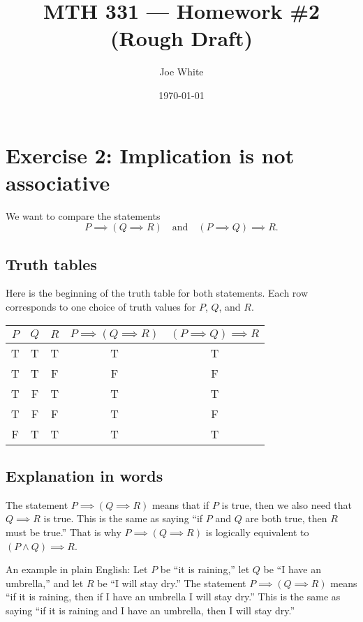 \documentclass[11pt]{article}
\title{MTH 331 — Homework \#2 (Rough Draft)}
\author{Joe White}
\date{\today}
\begin{document}
\maketitle

\section*{Exercise 2: Implication is not associative}

We want to compare the statements
\[
P \implies (Q \implies R) \quad \text{and} \quad (P \implies Q) \implies R.
\]

\subsection*{Truth tables}
Here is the beginning of the truth table for both statements. Each row corresponds to one choice of truth values for $P$, $Q$, and $R$.

\begin{center}
\begin{tabular}{|c|c|c||c|c|}
\hline
$P$ & $Q$ & $R$ & $P \implies (Q \implies R)$ & $(P \implies Q) \implies R$ \\
\hline
T & T & T & T & T \\
T & T & F & F & F \\
T & F & T & T & T \\
T & F & F & T & F \\
F & T & T & T & T \\
\hline
\end{tabular}
\end{center}

\subsection*{Explanation in words}
The statement $P \implies (Q \implies R)$ means that if $P$ is true, then we also need that $Q \implies R$ is true. This is the same as saying “if $P$ and $Q$ are both true, then $R$ must be true.” That is why $P \implies (Q \implies R)$ is logically equivalent to $(P \land Q) \implies R$.

An example in plain English: Let $P$ be “it is raining,” let $Q$ be “I have an umbrella,” and let $R$ be “I will stay dry.” The statement $P \implies (Q \implies R)$ means “if it is raining, then if I have an umbrella I will stay dry.” This is the same as saying “if it is raining and I have an umbrella, then I will stay dry.”
\end{document}
